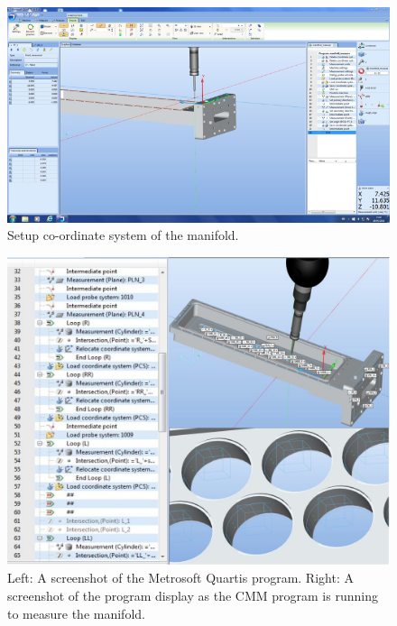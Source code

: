 \begin{figure}[th]
\centering
\includegraphics{Figures/cmm2}
\decoRule
\caption{Setup co-ordinate system of the manifold.}
\label{fig:cmm2}
\end{figure}

\begin{figure}[th]
\centering
\includegraphics[scale=0.5]{Figures/ccmprogram.png}
\decoRule
\caption{Left: A screenshot of the Metrosoft Quartis program. Right: A screenshot of the program display as the CMM program is running to measure the manifold.}
\label{fig:cmmprogram}
\end{figure}

